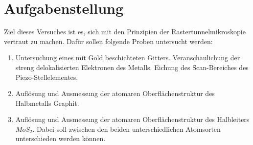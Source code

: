 \section{Aufgabenstellung}

Ziel dieses Versuches ist es, sich mit den Prinzipien der Rastertunnelmikroskopie vertraut zu machen. Dafür sollen folgende Proben untersucht werden:
\begin{enumerate}
 \item Untersuchung eines mit Gold beschichteten Gitters.
      Veranschaulichung der streng delokalisierten Elektronen des Metalls. Eichung des Scan-Bereiches des Piezo-Stellelementes.
 \item Auflösung und Ausmessung der atomaren Oberflächenstruktur des Halbmetalls Graphit.
 \item Auflösung und Ausmessung der atomaren Oberflächenstruktur des Halbleiters $MoS_2$. Dabei soll zwischen den beiden unterschiedlichen Atomsorten unterschieden werden können.
\end{enumerate}